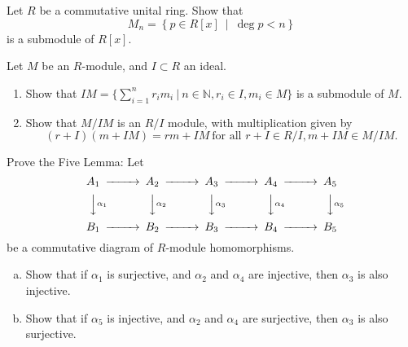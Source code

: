 \documentclass{problemset}
\begin{document}
\begin{exercise} Let \(R\) be a commutative unital ring.  Show that \[M_n = \left\{ p \in R[x]\ \middle|\ \deg p < n \right\}\] is a submodule of \(R[x]\).
\end{exercise}


\begin{exercise} Let \(M\) be an \(R\)-module, and \(I \subset R\) an ideal. 
\begin{enumerate}
\item Show that \(IM = \{ \sum _{i=1} ^n r_i m_i\ |\ n \in \mathbb{N}, r_i \in I, m_i \in M\}\) is a submodule of \(M\).
\item Show that \(M/IM\) is an \(R/I\) module, with multiplication given by \[(r+I)(m+IM)=rm+IM\ \text{for all }r +I\in R/I, m+IM \in M/IM.\]
\end{enumerate}
\end{exercise}


\begin{exercise} Prove the Five Lemma: Let
\[\begin{CD}
A_1 @>>> A_2 @>>> A_3 @>>> A_4 @>>> A_5\\
@VV\alpha _1V @VV\alpha _2V @VV\alpha _3V @VV\alpha _4V @VV\alpha _5V \\
B_1 @>>> B_2 @>>> B_3 @>>> B_4 @>>> B_5\\
\end{CD}\]
be a commutative diagram of \(R\)-module homomorphisms.
\begin{enumerate}[(a)]
\item Show that if \(\alpha _1\) is surjective, and \(\alpha _2\) and \(\alpha _4\) are injective, then \(\alpha _3\) is also injective.
\item Show that if \(\alpha _5\) is injective, and \(\alpha _2\) and \(\alpha _4\) are surjective, then \(\alpha _3\) is also surjective.
\end{enumerate}
\end{exercise}

\end{document}
